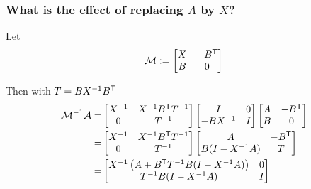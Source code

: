 %
\subsubsection{What is the effect of replacing $A$ by $X$?}
%
Let
%
\begin{align*}
\mathcal M := \begin{bmatrix}
X & -{B}^{\mathsf{T}}\\
B & 0 
\end{bmatrix}
\end{align*}
%

Then with $T=B X^{-1}{B}^{\mathsf{T}}$
%
\begin{align*}
\mathcal M^{-1}\mathcal A =&
\begin{bmatrix}
X^{-1}  & X^{-1}{B}^{\mathsf{T}}T^{-1}\\
0 & T^{-1}
\end{bmatrix}
\begin{bmatrix}
I  & 0\\
-BX^{-1} & I
\end{bmatrix}
\begin{bmatrix}
A & -{B}^{\mathsf{T}}\\
B & 0 
\end{bmatrix}\\
=&
\begin{bmatrix}
X^{-1}  & X^{-1}{B}^{\mathsf{T}}T^{-1}\\
0 & T^{-1}
\end{bmatrix}
\begin{bmatrix}
A  & -{B}^{\mathsf{T}}\\
B(I -X^{-1}A) & T
\end{bmatrix}\\
=&
\begin{bmatrix}
X^{-1}\left(A + {B}^{\mathsf{T}}T^{-1}B(I-X^{-1}A)\right)  & 0\\
T^{-1}B(I -X^{-1}A) & I
\end{bmatrix}
\end{align*}
%


